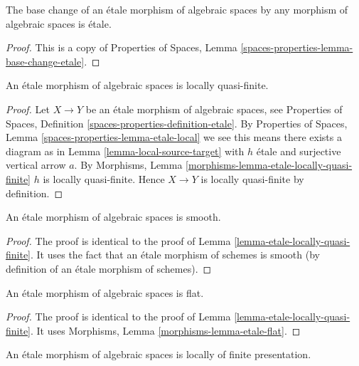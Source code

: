 \begin{lemma}
\label{lemma-base-change-etale}
The base change of an \'etale morphism of algebraic spaces
by any morphism of algebraic spaces is \'etale.
\end{lemma}

\begin{proof}
This is a copy of
Properties of Spaces, Lemma \ref{spaces-properties-lemma-base-change-etale}.
\end{proof}

\begin{lemma}
\label{lemma-etale-locally-quasi-finite}
An \'etale morphism of algebraic spaces is locally quasi-finite.
\end{lemma}

\begin{proof}
Let $X \to Y$ be an \'etale morphism of algebraic spaces, see
Properties of Spaces, Definition \ref{spaces-properties-definition-etale}.
By
Properties of Spaces, Lemma \ref{spaces-properties-lemma-etale-local}
we see this means there exists a diagram as in
Lemma \ref{lemma-local-source-target}
with $h$ \'etale and surjective vertical arrow $a$. By
Morphisms, Lemma \ref{morphisms-lemma-etale-locally-quasi-finite}
$h$ is locally quasi-finite. Hence $X \to Y$ is locally quasi-finite
by definition.
\end{proof}

\begin{lemma}
\label{lemma-etale-smooth}
An \'etale morphism of algebraic spaces is smooth.
\end{lemma}

\begin{proof}
The proof is identical to the proof of
Lemma \ref{lemma-etale-locally-quasi-finite}.
It uses the fact that an \'etale morphism of schemes is smooth
(by definition of an \'etale morphism of schemes).
\end{proof}

\begin{lemma}
\label{lemma-etale-flat}
An \'etale morphism of algebraic spaces is flat.
\end{lemma}

\begin{proof}
The proof is identical to the proof of
Lemma \ref{lemma-etale-locally-quasi-finite}.
It uses
Morphisms, Lemma \ref{morphisms-lemma-etale-flat}.
\end{proof}

\begin{lemma}
\label{lemma-etale-locally-finite-presentation}
An \'etale morphism of algebraic spaces is locally of finite presentation.
\end{lemma}

